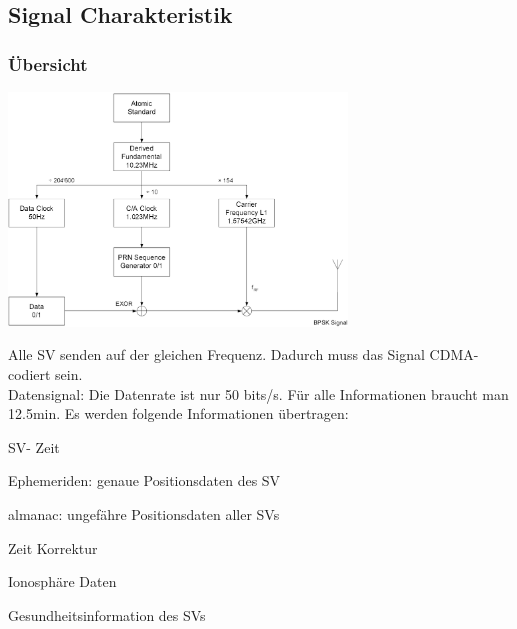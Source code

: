 \subsection{Signal Charakteristik}
	\subsubsection{Übersicht}
		\begin{minipage}{9cm}
      		\includegraphics[width=9cm]{./bilder/GPS-Signalaufbau}
        \end{minipage}
		\begin{minipage}{10cm}
        	Alle SV senden auf der gleichen Frequenz. Dadurch muss das
        	Signal CDMA- codiert sein.\\
        	Datensignal: Die Datenrate ist nur 50 bits/s. Für alle Informationen	
        	braucht man 12.5min. Es werden folgende Informationen übertragen:
        	\begin{liste}
            	\item SV- Zeit
            	\item Ephemeriden: genaue Positionsdaten des SV
            	\item almanac: ungefähre Positionsdaten aller SVs
            	\item Zeit Korrektur
            	\item Ionosphäre Daten
            	\item Gesundheitsinformation des SVs
            \end{liste}
		\end{minipage} 

